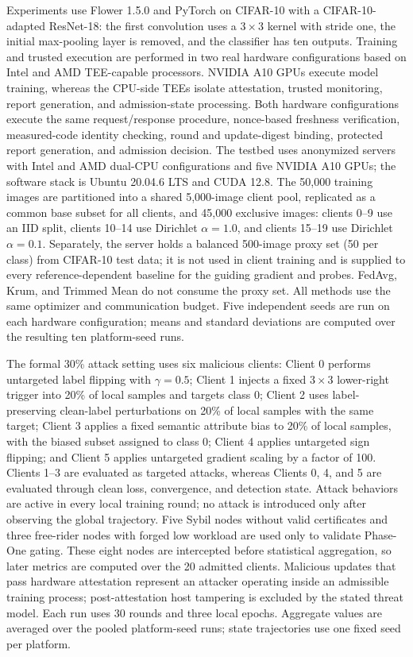\documentclass[conference,compsoc]{IEEEtran}
\begin{document}
Experiments use Flower 1.5.0 and PyTorch on CIFAR-10 with a CIFAR-10-adapted ResNet-18: the first convolution uses a $3\times3$ kernel with stride one, the initial max-pooling layer is removed, and the classifier has ten outputs. Training and trusted execution are performed in two real hardware configurations based on Intel and AMD TEE-capable processors. NVIDIA A10 GPUs execute model training, whereas the CPU-side TEEs isolate attestation, trusted monitoring, report generation, and admission-state processing. Both hardware configurations execute the same request/response procedure, nonce-based freshness verification, measured-code identity checking, round and update-digest binding, protected report generation, and admission decision. The testbed uses anonymized servers with Intel and AMD dual-CPU configurations and five NVIDIA A10 GPUs; the software stack is Ubuntu 20.04.6 LTS and CUDA 12.8. The 50,000 training images are partitioned into a shared 5,000-image client pool, replicated as a common base subset for all clients, and 45,000 exclusive images: clients 0--9 use an IID split, clients 10--14 use Dirichlet $\alpha=1.0$, and clients 15--19 use Dirichlet $\alpha=0.1$. Separately, the server holds a balanced 500-image proxy set (50 per class) from CIFAR-10 test data; it is not used in client training and is supplied to every reference-dependent baseline for the guiding gradient and probes. FedAvg, Krum, and Trimmed Mean do not consume the proxy set. All methods use the same optimizer and communication budget. Five independent seeds are run on each hardware configuration; means and standard deviations are computed over the resulting ten platform-seed runs.

The formal 30\% attack setting uses six malicious clients: Client 0 performs untargeted label flipping with $\gamma=0.5$; Client 1 injects a fixed $3\times3$ lower-right trigger into 20\% of local samples and targets class 0; Client 2 uses label-preserving clean-label perturbations on 20\% of local samples with the same target; Client 3 applies a fixed semantic attribute bias to 20\% of local samples, with the biased subset assigned to class 0; Client 4 applies untargeted sign flipping; and Client 5 applies untargeted gradient scaling by a factor of 100. Clients 1--3 are evaluated as targeted attacks, whereas Clients 0, 4, and 5 are evaluated through clean loss, convergence, and detection state. Attack behaviors are active in every local training round; no attack is introduced only after observing the global trajectory. Five Sybil nodes without valid certificates and three free-rider nodes with forged low workload are used only to validate Phase-One gating. These eight nodes are intercepted before statistical aggregation, so later metrics are computed over the 20 admitted clients. Malicious updates that pass hardware attestation represent an attacker operating inside an admissible training process; post-attestation host tampering is excluded by the stated threat model. Each run uses 30 rounds and three local epochs. Aggregate values are averaged over the pooled platform-seed runs; state trajectories use one fixed seed per platform.
\end{document}
